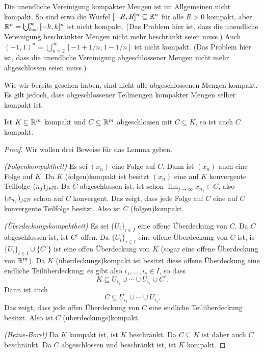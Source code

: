 \documentclass[a4paper,10pt]{article}
\begin{document}
\begin{bem}
 Die unendliche Vereinigung kompakter Mengen ist im Allgemeinen nicht kompakt. So sind etwa die Würfel $[-R, R]^n \subseteq \mathbb{R}^n$ für alle $R > 0$ kompakt, aber $\mathbb{R}^n = \bigcup_{k=1}^\infty [-k,k]^n$ ist nicht kompakt. (Das Problem hier ist, dass die unendliche Vereinigung beschränkter Mengen nicht mehr beschränkt seien muss.) Auch $(-1,1)^n = \bigcup_{n=2}^\infty [-1+1/n, 1-1/n]$ ist nicht kompakt. (Das Problem hier ist, dass die unendliche Vereinigung abgeschlossener Mengen nicht mehr abgeschlossen seien muss.)
\end{bem}


Wie wir bereits gesehen haben, sind nicht alle abgeschlossenen Mengen kompakt. Es gilt jedoch, dass abgeschlossener Teilmengen kompakter Mengen selber kompakt ist.


\begin{lem}\label{lem: abgeschlossen Teilmengen von kompakten Mengen}
 Ist $K \subseteq \mathbb{R}^m$ kompakt und $C \subseteq \mathbb{R}^m$ abgeschlossen mit $C \subseteq K$, so ist auch $C$ kompakt.
\end{lem}
\begin{proof}
 Wir wollen drei Beweise für das Lemma geben.
 
 \emph{(Folgenkompaktheit)} Es sei $(x_n)$ eine Folge auf $C$. Dann ist $(x_n)$ auch eine Folge auf $K$. Da $K$ (folgen)kompakt ist besitzt $(x_n)$ eine auf $K$ konvergente Teilfolge $(n_j)_{j \in \mathbb{N}}$. Da $C$ abgeschlossen ist, ist schon $\lim_{j \to \infty} x_{n_j} \in C$, also $(x_{n_j})_{j \in \mathbb{N}}$ schon auf $C$ konvergent. Das zeigt, dass jede Folge auf $C$ eine auf $C$ konvergente Teilfolge besitzt. Also ist $C$ (folgen)kompakt.
 
 \emph{(Überdeckungskompaktheit)} Es sei $\{U_i\}_{i \in I}$ eine offene Überdeckung von $C$. Da $C$ abgeschlossen ist, ist $C^c$ offen. Da $\{U_i\}_{i \in I}$ eine offene Überdeckung von $C$ ist, is $\{U_i\}_{i \in I} \cup \{C^c\}$ ist eine offen Überdeckung von $K$ (sogar eine offene Überdeckung von $\mathbb{R}^m$). Da $K$ (überdeckungs)kompakt ist besitzt diese offene Überdeckung eine endliche Teilüberdeckung; es gibt also $i_1, \dotsc, i_s \in I$, so dass
 \[
  K \subseteq U_{i_1} \cup \dotsb \cup U_{i_s} \cup C^c.
 \]
 Dann ist auch
 \[
  C \subseteq U_{i_1} \cup \dotsb \cup U_{i_s}.
 \]
 Das zeigt, dass jede offen Überdeckung von $C$ eine endliche Teilüberdeckung besitzt. Also ist $C$ (überdeckungs)kompakt.
 
 \emph{(Heine-Borel)} Da $K$ kompakt ist, ist $K$ beschränkt. Da $C \subseteq K$ ist daher auch $C$ beschränkt. Da $C$ abgeschlossen und beschränkt ist, ist $K$ kompakt.
\end{proof}
\end{document}
